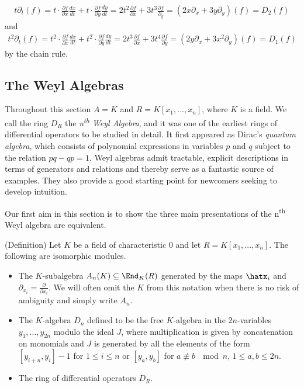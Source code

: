 \begin{example}
	\begin{align*}
		t\partial_t(f) = t\cdot \frac{\partial f}{\partial x} \frac{dx}{dt} + t\cdot \frac{\partial f}{\partial y} \frac{dy}{dt} = 2t^2\frac{\partial f}{\partial x} + 3t^3\frac{\partial f}{\partial_y} = (2x\partial_x + 3y\partial_y)(f) = D_2(f)
	\end{align*}
	and
	\begin{align*}
		t^2\partial_t(f) = t^2\cdot \frac{\partial f}{\partial x}\frac{dx}{dt} + t^2 \cdot \frac{\partial f}{\partial y}\frac{dy}{dt} = 2t^3\frac{\partial f}{\partial x} + 3t^4\frac{\partial f}{\partial y} = (2y\partial_x + 3x^2\partial_y)(f) = D_1(f)
	\end{align*}
	by the chain rule. 
\end{example}
\subsection{The Weyl Algebras}\label{sec:Weyl-algebra}

Throughout this section $A = K$ and $R = K[x_1,...,x_n]$, where $K$ is a field. We call the ring $D_{R}$ the \emph{n\textsuperscript{th} Weyl Algebra}, and it was one of the earliest rings of differential operators to be studied in detail. It first appeared as Dirac's \emph{quantum algebra}, which consists of polynomial expressions in variables $p$ and $q$ subject to the relation $pq - qp = 1$. Weyl algebras admit tractable, explicit descriptions in terms of generators and relations and thereby serve as a fantastic source of examples. They also provide a good starting point for newcomers seeking to develop intuition.

Our first aim in this section is to show the three main presentations of the n\textsuperscript{th} Weyl algebra are equivalent.

\begin{thm}(Definition)\label{thm:Weyl-algebra-defs}
	Let $K$ be a field of characteristic $0$ and let $R = K[x_1,...,x_n]$. The following are isomorphic modules.
	\begin{itemize}
		\item The $K$-subalgebra $A_n(K) \subseteq \End_K(R)$ generated by the maps $\hatx_i$ and $\partial_{x_i} = \frac{\partial}{\partial x_i}$. We will often omit the $K$ from this notation when there is no risk of ambiguity and simply write $A_n$.
		\item The $K$-algebra $D_n$ defined to be the free $K$-algebra in the $2n$-variables $y_1,...,y_{2n}$ modulo the ideal $J$, where multiplication is given by concatenation on monomials and $J$ is generated by all the elements of the form $[y_{i+n},y_{i}] - 1$ for $1\leq i\leq n$ or $[y_a,y_b]$ for $a \not\equiv b ~ \mod n$, $1\leq a,b\leq 2n$.
		\item The ring of differential operators $D_{R}$.
	\end{itemize}
\end{thm}

